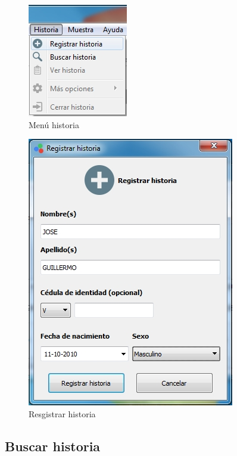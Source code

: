 \begin{figure}[H]
  \centering
  \includegraphics[width=.3\linewidth]{./img/menu-historia.jpg}
\caption[]{Men\'{u} historia\label{fig:menu-historia}}
\end{figure}

\begin{figure}[H]
  \centering
  \includegraphics[width=.4\linewidth]{./img/registrar-historia.jpg}
\caption[]{Resgistrar historia\label{fig:registrar-historia}}
\end{figure}

	\subsection*{Buscar historia}
	
